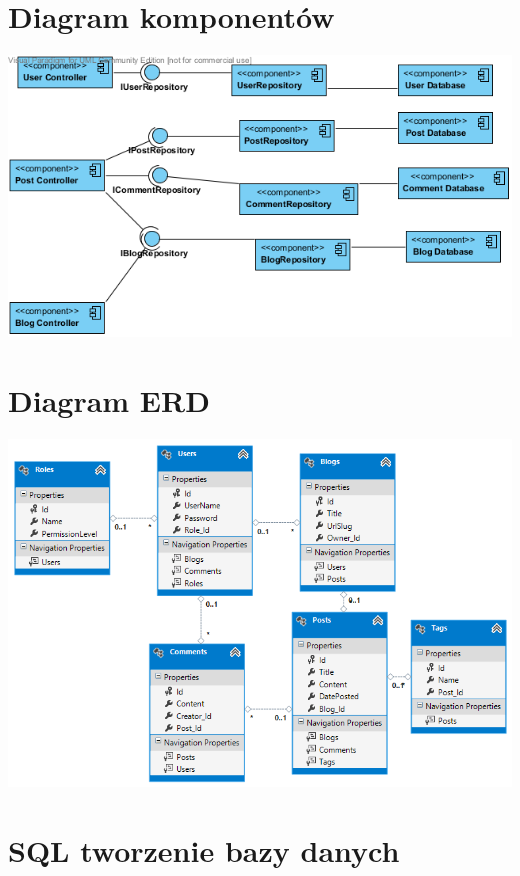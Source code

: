 \documentclass{article}
\begin{document}
\section{Diagram komponentów}
\includegraphics[width=\textwidth]{ComponetDiagram}
\section{Diagram ERD}
\includegraphics[width=\textwidth]{ERD}
\section{SQL tworzenie bazy danych}

\end{document}
